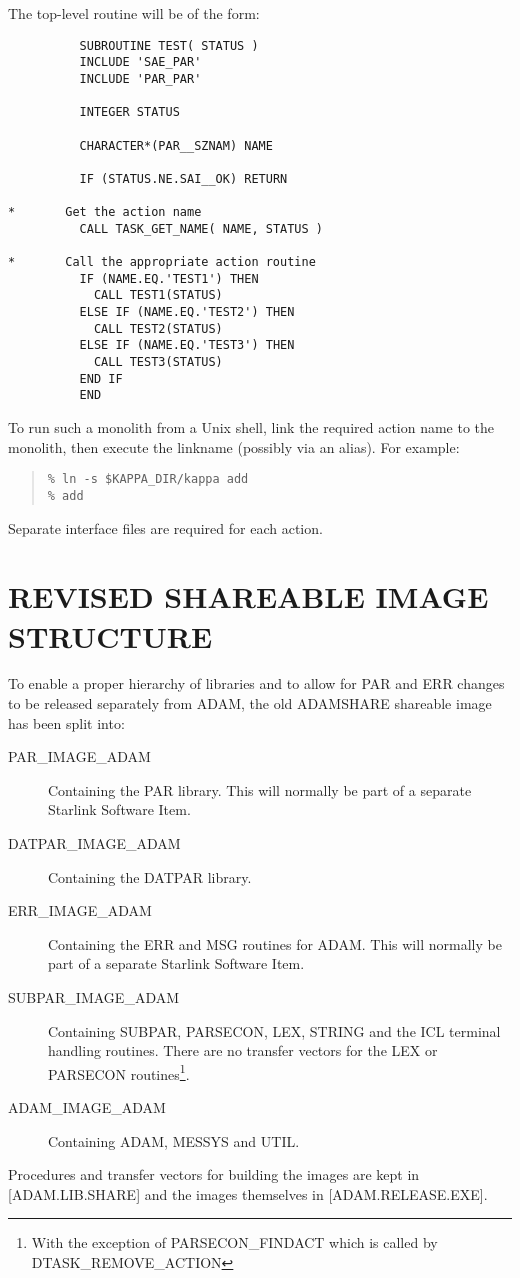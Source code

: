 The top-level routine will be of the form:
\begin{small}
\begin{verbatim}
          SUBROUTINE TEST( STATUS )
          INCLUDE 'SAE_PAR'
          INCLUDE 'PAR_PAR'

          INTEGER STATUS

          CHARACTER*(PAR__SZNAM) NAME

          IF (STATUS.NE.SAI__OK) RETURN

*       Get the action name
          CALL TASK_GET_NAME( NAME, STATUS )

*       Call the appropriate action routine
          IF (NAME.EQ.'TEST1') THEN
            CALL TEST1(STATUS)
          ELSE IF (NAME.EQ.'TEST2') THEN
            CALL TEST2(STATUS)
          ELSE IF (NAME.EQ.'TEST3') THEN
            CALL TEST3(STATUS)
          END IF
          END
\end{verbatim}
\end{small}

To run such a monolith from a Unix shell, link the required action name to the
monolith, then execute the linkname (possibly via an alias). For example:

\begin{quote} \begin{verbatim}
% ln -s $KAPPA_DIR/kappa add
% add
\end{verbatim} \end{quote}

Separate interface files are required for each action.

\section{REVISED SHAREABLE IMAGE STRUCTURE}
\label{shares}
To enable a proper hierarchy of libraries and to allow for PAR and ERR changes
to be released separately from ADAM, the old ADAMSHARE shareable image has been
split into:
\begin{description}
\item[PAR\_IMAGE\_ADAM] Containing the PAR library. This will normally be part
of a separate Starlink Software Item.
\item[DATPAR\_IMAGE\_ADAM] Containing the DATPAR library.
\item[ERR\_IMAGE\_ADAM] Containing the ERR and MSG routines for ADAM.
This will normally be part of a separate Starlink Software Item.
\item[SUBPAR\_IMAGE\_ADAM] Containing SUBPAR, PARSECON, LEX, STRING and the ICL
terminal handling routines. There are no transfer vectors for the LEX or
PARSECON routines\footnote{With the exception of PARSECON\_FINDACT which is
called by DTASK\_REMOVE\_ACTION}.
\item[ADAM\_IMAGE\_ADAM] Containing ADAM, MESSYS and UTIL.
\end{description}
Procedures and transfer vectors for building the images are kept in
[ADAM.LIB.SHARE] and the images themselves in [ADAM.RELEASE.EXE].

